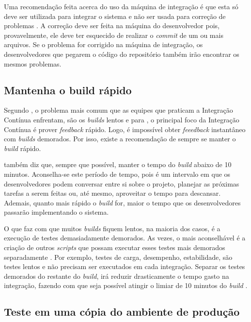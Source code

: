 Uma recomendação feita acerca do uso da máquina de integração é que esta só deve ser utilizada para integrar o sistema e não ser usada para correção de problemas \cite{SHORE}. A correção deve ser feita na máquina do desenvolvedor pois, provavelmente, ele deve ter esquecido de realizar o \textit{commit} de um ou mais arquivos. Se o problema for corrigido na máquina de integração, os desenvolvedores que pegarem o código do repositório também irão encontrar os mesmos problemas.

\subsection{Mantenha o {build} rápido}

Segundo , o problema mais comum que as equipes que praticam a Integração Contínua enfrentam, são os \textit{builds} lentos e para , o principal foco da Integração Contínua é prover \textit{feedback} rápido. Logo, é impossível obter \textit{feeedback} instantâneo com \textit{builds} demorados. Por isso, existe a recomendação de sempre se manter o \textit{build} rápido.

 também diz que, sempre que possível, manter o tempo do \textit{build} abaixo de 10 minutos. Aconselha-se este período de tempo, pois é um intervalo em que os desenvolvedores podem conversar entre si sobre o projeto, planejar as próximas tarefas a serem feitas ou, até mesmo, aproveitar o tempo para descansar. Ademais, quanto mais rápido o \textit{build} for, maior o tempo que os desenvolvedores passarão implementando o sistema.

O que faz com que muitos \textit{builds} fiquem lentos, na maioria dos casos, é a execução de testes demasiadamente demorados. As vezes, o mais aconselhável é a criação de outros \textit{scripts} que possam executar esses testes mais demorados separadamente \cite{SHORE}. Por exemplo, testes de carga, desempenho, estabilidade, são testes lentos e não precisam ser executados em cada integração. Separar os testes demorados do restante do \textit{build}, irá reduzir drasticamente o tempo gasto na integração, fazendo com que seja possível atingir o limiar de 10 minutos do \textit{build} \cite{BECK}.

\subsection{Teste em uma cópia do ambiente de produção}

